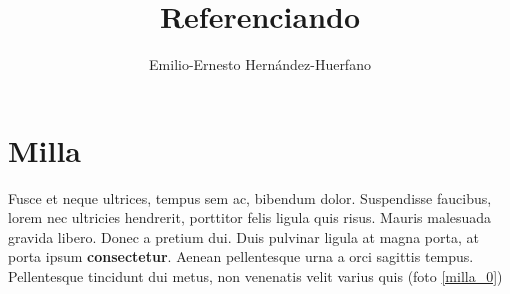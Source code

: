 \documentclass[12pt,letterpaper,oneside]{book}
\title{Referenciando}
\author{Emilio-Ernesto Hernández-Huerfano}
\begin{document}
\maketitle
\tableofcontents
\listoffigures


\chapter{Milla}
\noindent Fusce et neque ultrices, tempus sem ac, bibendum dolor. Suspendisse faucibus, lorem nec ultricies hendrerit, porttitor felis ligula quis risus. Mauris malesuada gravida libero. Donec a pretium dui. Duis pulvinar ligula at magna porta, at porta ipsum \textbf{consectetur}. Aenean pellentesque urna a orci sagittis tempus. Pellentesque tincidunt dui metus, non venenatis velit varius quis (foto \ref{milla_0})
\end{document}
